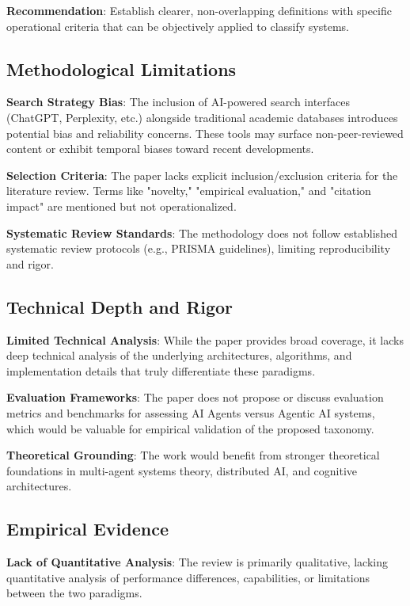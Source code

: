 \documentclass[12pt]{article}
\begin{document}
\textbf{Recommendation}: Establish clearer, non-overlapping definitions with specific operational criteria that can be objectively applied to classify systems.

\subsection{Methodological Limitations}

\textbf{Search Strategy Bias}: The inclusion of AI-powered search interfaces (ChatGPT, Perplexity, etc.) alongside traditional academic databases introduces potential bias and reliability concerns. These tools may surface non-peer-reviewed content or exhibit temporal biases toward recent developments.

\textbf{Selection Criteria}: The paper lacks explicit inclusion/exclusion criteria for the literature review. Terms like "novelty," "empirical evaluation," and "citation impact" are mentioned but not operationalized.

\textbf{Systematic Review Standards}: The methodology does not follow established systematic review protocols (e.g., PRISMA guidelines), limiting reproducibility and rigor.

\subsection{Technical Depth and Rigor}

\textbf{Limited Technical Analysis}: While the paper provides broad coverage, it lacks deep technical analysis of the underlying architectures, algorithms, and implementation details that truly differentiate these paradigms.

\textbf{Evaluation Frameworks}: The paper does not propose or discuss evaluation metrics and benchmarks for assessing AI Agents versus Agentic AI systems, which would be valuable for empirical validation of the proposed taxonomy.

\textbf{Theoretical Grounding}: The work would benefit from stronger theoretical foundations in multi-agent systems theory, distributed AI, and cognitive architectures.

\subsection{Empirical Evidence}

\textbf{Lack of Quantitative Analysis}: The review is primarily qualitative, lacking quantitative analysis of performance differences, capabilities, or limitations between the two paradigms.
\end{document}
